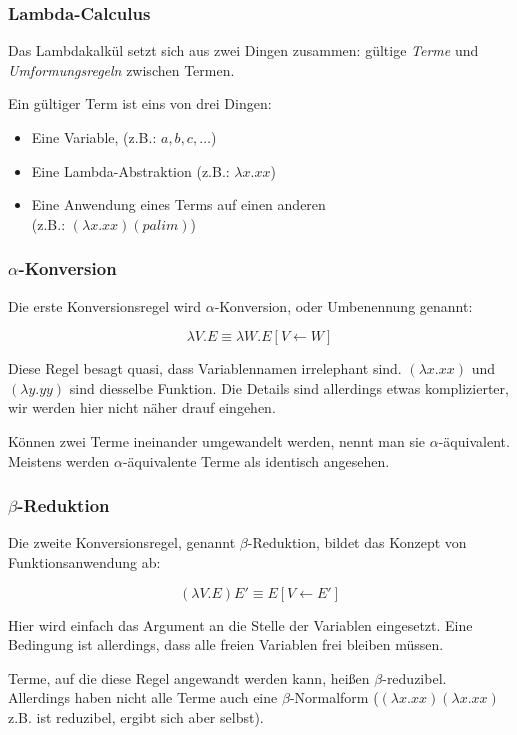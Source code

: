 \documentclass{beamer}
\begin{document}

\begin{frame}
\frametitle{Lambda-Calculus}

Das Lambdakalkül setzt sich aus zwei Dingen zusammen: gültige \emph{Terme} und \emph{Umformungsregeln}
zwischen Termen.\smallskip\smallskip\smallskip

Ein gültiger Term ist eins von drei Dingen:
\begin{itemize}
\pause\item Eine Variable, (z.B.: $a,b,c,\dots$)
\pause\item Eine Lambda-Abstraktion (z.B.: $\lambda x . xx$)
\pause\item Eine Anwendung eines Terms auf einen anderen
            \\ (z.B.: $(\lambda x . xx)(palim)$)
\end{itemize}
\end{frame}


\begin{frame}
\frametitle{$\alpha$-Konversion}

Die erste Konversionsregel wird $\alpha$-Konversion, oder Umbenennung genannt:

$$ \lambda V . E \equiv \lambda W.E [V \leftarrow W]$$
\pause

Diese Regel besagt quasi, dass Variablennamen irrelephant sind. $(\lambda x . xx)$ und $(\lambda y . yy)$ sind diesselbe Funktion. Die Details sind allerdings etwas komplizierter, wir werden hier nicht näher drauf eingehen.
\pause

Können zwei Terme ineinander umgewandelt werden, nennt man sie $\alpha$-äquivalent. Meistens werden $\alpha$-äquivalente Terme als identisch angesehen.
\end{frame}


\begin{frame}
\frametitle{$\beta$-Reduktion}

Die zweite Konversionsregel, genannt $\beta$-Reduktion, bildet das Konzept von Funktionsanwendung ab:

$$ (\lambda V . E) E' \equiv E [V \leftarrow E'] $$
\pause

Hier wird einfach das Argument an die Stelle der Variablen eingesetzt. Eine Bedingung ist allerdings,
dass alle freien Variablen frei bleiben müssen.\pause

Terme, auf die diese Regel angewandt werden kann, heißen $\beta$-reduzibel. Allerdings haben nicht alle Terme auch eine $\beta$-Normalform ($(\lambda x.xx)(\lambda x.xx)$ z.B. ist reduzibel, ergibt sich aber selbst).
\end{frame}
\end{document}
